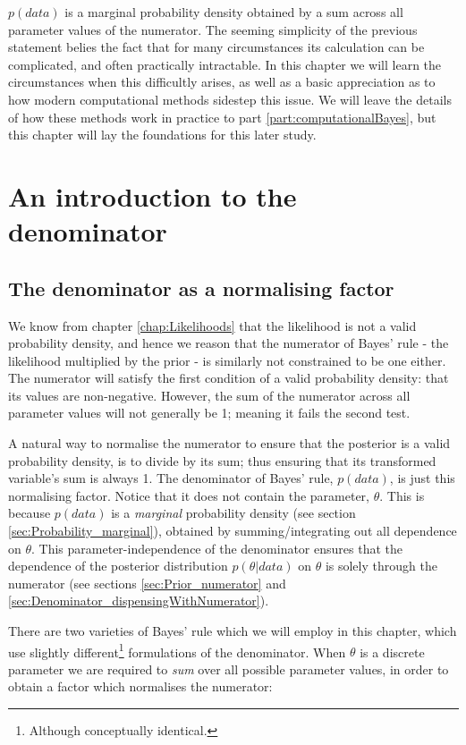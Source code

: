 \documentclass[11pt,fullpage]{book}
\begin{document}
$p(data)$ is a marginal probability density obtained by a sum across all parameter values of the numerator. The seeming simplicity of the previous statement belies the fact that for many circumstances its calculation can be complicated, and often practically intractable. In this chapter we will learn the circumstances when this difficultly arises, as well as a basic appreciation as to how modern computational methods sidestep this issue. We will leave the details of how these methods work in practice to part \ref{part:computationalBayes}, but this chapter will lay the foundations for this later study.

\section{An introduction to the denominator}
\subsection{The denominator as a normalising factor}
We know from chapter \ref{chap:Likelihoods} that the likelihood is not a valid probability density, and hence we reason that the numerator of Bayes' rule - the likelihood multiplied by the prior - is similarly not constrained to be one either. The numerator will satisfy the first condition of a valid probability density: that its values are non-negative. However, the sum of the numerator across all parameter values will not generally be 1; meaning it fails the second test.

A natural way to normalise the numerator to ensure that the posterior is a valid probability density, is to divide by its sum; thus ensuring that its transformed variable's sum is always 1. The denominator of Bayes' rule, $p(data)$, is just this normalising factor. Notice that it does not contain the parameter, $\theta$. This is because $p(data)$ is a \textit{marginal} probability density (see section \ref{sec:Probability_marginal}), obtained by summing/integrating out all dependence on $\theta$. This parameter-independence of the denominator ensures that the dependence of the posterior distribution $p(\theta|data)$ on $\theta$ is solely through the numerator (see sections \ref{sec:Prior_numerator} and \ref{sec:Denominator_dispensingWithNumerator}). 

There are two varieties of Bayes' rule which we will employ in this chapter, which use slightly different\footnote{Although conceptually identical.} formulations of the denominator. When $\theta$ is a discrete parameter we are required to \textit{sum} over all possible parameter values, in order to obtain a factor which normalises the numerator:
\end{document}
